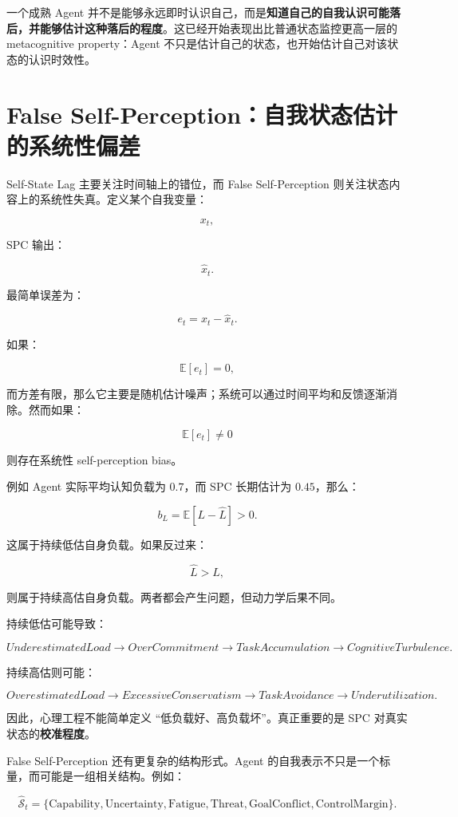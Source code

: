 一个成熟 Agent 并不是能够永远即时认识自己，而是\textbf{知道自己的自我认识可能落后，并能够估计这种落后的程度}。这已经开始表现出比普通状态监控更高一层的 metacognitive property：Agent 不只是估计自己的状态，也开始估计自己对该状态的认识时效性。

\section{False Self-Perception：自我状态估计的系统性偏差}

Self-State Lag 主要关注时间轴上的错位，而 False Self-Perception 则关注状态内容上的系统性失真。定义某个自我变量：

\[
x_t,
\]

SPC 输出：

\[
\hat{x}_t.
\]

最简单误差为：

\[
e_t=x_t-\hat{x}_t.
\]

如果：

\[
\mathbb E[e_t]=0,
\]

而方差有限，那么它主要是随机估计噪声；系统可以通过时间平均和反馈逐渐消除。然而如果：

\[
\boxed{
\mathbb E[e_t]\neq0
}
\]

则存在系统性 self-perception bias。

例如 Agent 实际平均认知负载为 $0.7$，而 SPC 长期估计为 $0.45$，那么：

\[
b_L
=
\mathbb E[L-\hat L]
>0.
\]

这属于持续低估自身负载。如果反过来：

\[
\hat L>L,
\]

则属于持续高估自身负载。两者都会产生问题，但动力学后果不同。

持续低估可能导致：

\[
UnderestimatedLoad
\rightarrow
OverCommitment
\rightarrow
TaskAccumulation
\rightarrow
CognitiveTurbulence.
\]

持续高估则可能：

\[
OverestimatedLoad
\rightarrow
ExcessiveConservatism
\rightarrow
TaskAvoidance
\rightarrow
Underutilization.
\]

因此，心理工程不能简单定义 ``低负载好、高负载坏''。真正重要的是 SPC 对真实状态的\textbf{校准程度}。

False Self-Perception 还有更复杂的结构形式。Agent 的自我表示不只是一个标量，而可能是一组相关结构。例如：

\[
\hat{\mathcal S}_t
=
\{
\text{Capability},
\text{Uncertainty},
\text{Fatigue},
\text{Threat},
\text{GoalConflict},
\text{ControlMargin}
\}.
\]

